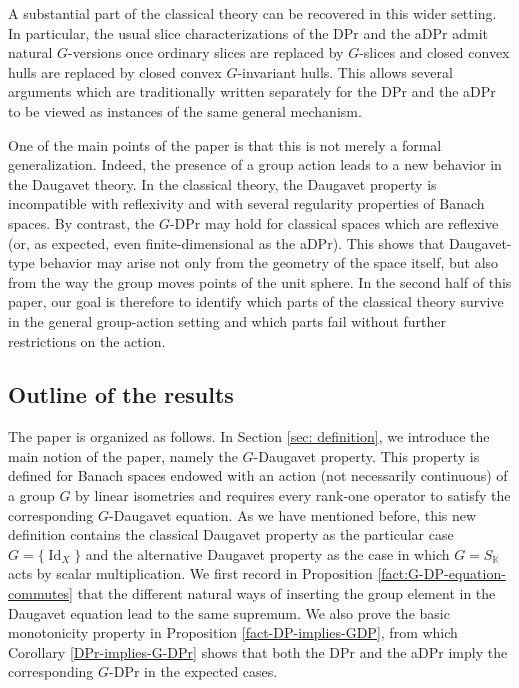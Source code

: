 \documentclass[a4paper,12pt]{amsart}
\theoremstyle{definition}
\theoremstyle{definition}
\theoremstyle{remark}
\numberwithin{equation}{section}
\newcommand{\K}{\mathbb{K}}
\DeclareMathOperator{\id}{Id}
\newcommand{\<}{\langle}
\renewcommand{\>}{\rangle}
\begin{document}
	A substantial part of the classical theory can be recovered in this wider setting. In particular, the usual slice characterizations of the DPr and the aDPr admit natural $G$-versions once ordinary slices are replaced by $G$-slices and closed convex hulls are replaced by closed convex $G$-invariant hulls. This allows several arguments which are traditionally written separately for the DPr and the aDPr to be viewed as instances of the same general mechanism.
	
	One of the main points of the paper is that this is not merely a formal generalization. Indeed, the presence of a group action leads to a new behavior in the Daugavet theory. In the classical theory, the Daugavet property is incompatible with reflexivity and with several regularity properties of Banach spaces. By contrast, the $G$-DPr may hold for classical spaces which are reflexive (or, as expected, even finite-dimensional as the aDPr). This shows that Daugavet-type behavior may arise not only from the geometry of the space itself, but also from the way the group moves points of the unit sphere. In the second half of this paper, our goal is therefore to identify which parts of the classical theory survive in the general group-action setting and which parts fail without further restrictions on the action.
	
	
	
	\subsection{Outline of the results}
	
	The paper is organized as follows. In Section \ref{sec: definition}, we introduce the main notion of the paper, namely the $G$-Daugavet property. This property is defined for Banach spaces endowed with an action (not necessarily continuous) of a group $G$ by linear isometries and requires every rank-one operator to satisfy the corresponding $G$-Daugavet equation. As we have mentioned before, this new definition contains the classical Daugavet property as the particular case $G=\{\id_X\}$ and the alternative Daugavet property as the case in which $G=S_{\K}$ acts by scalar multiplication. We first record in Proposition \ref{fact:G-DP-equation-commutes} that the different natural ways of inserting the group element in the Daugavet equation lead to the same supremum. We also prove the basic monotonicity property in Proposition \ref{fact-DP-implies-GDP}, from which Corollary \ref{DPr-implies-G-DPr} shows that both the DPr and the aDPr imply the corresponding $G$-DPr in the expected cases.
	
\end{document}
